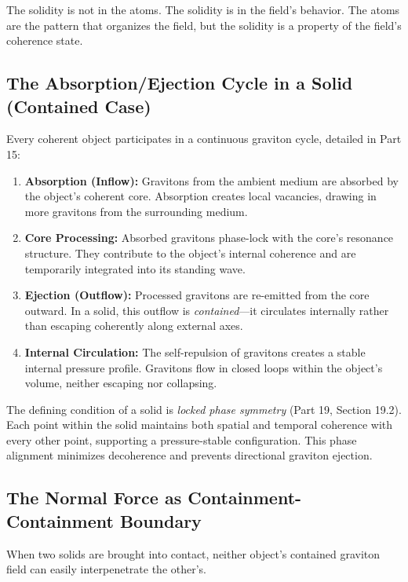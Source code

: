 \documentclass[12pt, a4paper]{article}
\begin{document}
The solidity is not in the atoms. The solidity is in the field's behavior. The atoms are the pattern that organizes the field, but the solidity is a property of the field's coherence state.

\subsection{The Absorption/Ejection Cycle in a Solid (Contained Case)}
\label{subsec:contained_cycle}

Every coherent object participates in a continuous graviton cycle, detailed in Part 15:

\begin{enumerate}
    \item \textbf{Absorption (Inflow):} Gravitons from the ambient medium are absorbed by the object's coherent core. Absorption creates local vacancies, drawing in more gravitons from the surrounding medium.
    \item \textbf{Core Processing:} Absorbed gravitons phase-lock with the core's resonance structure. They contribute to the object's internal coherence and are temporarily integrated into its standing wave.
    \item \textbf{Ejection (Outflow):} Processed gravitons are re-emitted from the core outward. In a solid, this outflow is \textit{contained}—it circulates internally rather than escaping coherently along external axes.
    \item \textbf{Internal Circulation:} The self-repulsion of gravitons creates a stable internal pressure profile. Gravitons flow in closed loops within the object's volume, neither escaping nor collapsing.
\end{enumerate}

The defining condition of a solid is \textit{locked phase symmetry} (Part 19, Section 19.2). Each point within the solid maintains both spatial and temporal coherence with every other point, supporting a pressure-stable configuration. This phase alignment minimizes decoherence and prevents directional graviton ejection.

\subsection{The Normal Force as Containment-Containment Boundary}
\label{subsec:normal_force}

When two solids are brought into contact, neither object's contained graviton field can easily interpenetrate the other's.
\end{document}
